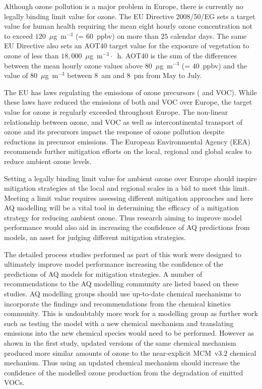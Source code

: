 Although ozone pollution is a major problem in Europe, there is currently no legally binding limit value for ozone.
The EU Directive 2008/50/EG sets a target value for human health requiring the mean eight hourly ozone concentration not to exceed $120$~$\mu$g~m$^{-3}$ (= $60$~ppbv) on more than $25$ calendar days.
The same EU Directive also sets an AOT40 target value for the exposure of vegetation to ozone of less than $18,000$~$\mu$g~m$^{-3} \cdot$~h. 
AOT40 is the sum of the differences between the mean hourly ozone values above $80$~$\mu$g~m$^{-3}$ (= $40$~ppbv) and the value of $80$~$\mu$g~m$^{-3}$ between 8~am and 8~pm from May to July.

The EU has laws regulating the emissions of ozone precursors ( and VOC).
While these laws have reduced the emissions of both  and VOC over Europe, the target value for ozone is regularly exceeded throughout Europe.
The non-linear relationship between ozone,  and VOC as well as intercontinental transport of ozone and its precursors impact the response of ozone pollution despite reductions in precursor emissions.
The European Environmental Agency (EEA) recommends further mitigation efforts on the local, regional and global scales to reduce ambient ozone levels.

Setting a legally binding limit value for ambient ozone over Europe should inspire mitigation strategies at the local and regional scales in a bid to meet this limit.
Meeting a limit value requires assessing different mitigation approaches and here AQ modelling will be a vital tool in determining the efficacy of a mitigation strategy for reducing ambient ozone. 
Thus research aiming to improve model performance would also aid in increasing the confidence of AQ predictions from models, an asset for judging different mitigation strategies.

The detailed process studies performed as part of this work were designed to ultimately improve model performance increasing the confidence of the predictions of AQ models for mitigation strategies.
A number of recommendations to the AQ modelling community are listed based on these studies.
AQ modelling groups should use up-to-date chemical mechanisms to incorporate the findings and recommendations from the chemical kinetics community.
This is undoubtably more work for a modelling group as further work such as testing the model with a new chemical mechanism and translating emissions into the new chemical species would need to be performed.
However as shown in the first study, updated versions of the same chemical mechanism produced more similar amounts of ozone to the near-explicit MCM~v3.2 chemical mechanism.
Thus using an updated chemical mechanism should increase the confidence of the modelled ozone production from the degradation of emitted VOCs.


